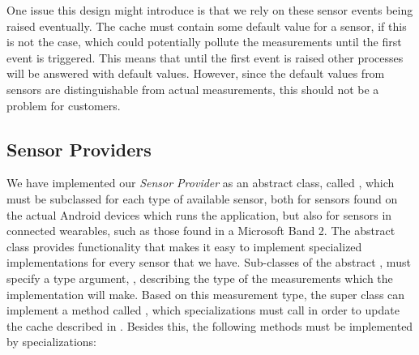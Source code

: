 One issue this design might introduce is that we rely on these sensor events being raised eventually. The cache must contain some default value for a sensor, if this is not the case, which could potentially pollute the measurements until the first event is triggered. This means that until the first event is raised other processes will be answered with default values. However, since the default values from sensors are distinguishable from actual measurements, this should not be a problem for customers.


\subsection{Sensor Providers}
\label{sub:providing_sensor_data_implementation}
We have implemented our \emph{Sensor Provider} as an abstract class, called , which must be subclassed for each type of available sensor, both for sensors found on the actual Android devices which runs the application, but also for sensors in connected wearables, such as those found in a Microsoft Band 2. The abstract class provides functionality that makes it easy to implement specialized implementations for every sensor that we have. Sub-classes of the abstract , must specify a type argument, , describing the type of the measurements which the implementation will make. Based on this measurement type, the super class can implement a method called , which specializations must call in order to update the cache described in . Besides this, the following methods must be implemented by specializations:

